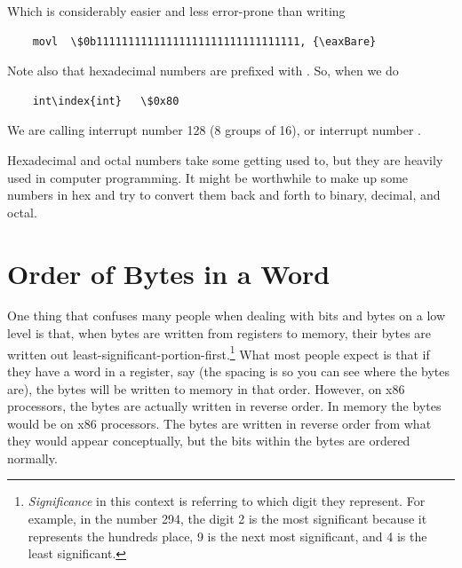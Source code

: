 Which is considerably easier and less error-prone than writing

\begin{simpletyping}
\begin{lstlisting}
	movl  \$0b11111111111111111111111111111111, {\eaxBare}
\end{lstlisting}
\end{simpletyping}

Note also that hexadecimal numbers are prefixed with .
So, when we do 

\begin{simpletyping}
\begin{lstlisting}
	int\index{int}   \$0x80
\end{lstlisting}
\end{simpletyping}

We are calling interrupt number 128 (8 groups of 16), or interrupt
number .

Hexadecimal and octal numbers take some getting used to, but they
are heavily used in computer programming.  It might be worthwhile
to make up some numbers in hex and try to convert them back and forth
to binary, decimal, and octal.

\section{Order of Bytes in a Word}

One thing that confuses many people when dealing with bits and bytes on a low
level is that, when bytes are written from registers to memory, their bytes
are written out least-significant-portion-first.\footnote{\emph{Significance} in this context is referring to which digit they represent.  For example, in the number 294, the digit 2 is the most significant because it represents the hundreds place, 9 is the next most significant, and 4 is the least significant.}  What most people expect
is that if they have a word in a register, say  (the spacing is so you can see where the bytes are), the bytes will be 
written to memory in that order.  However, on x86 processors, the bytes are actually
written in reverse order.  In memory the bytes would be 
 on x86 processors.  The bytes are written 
in reverse order from what they would appear conceptually, but the bits within 
the bytes are ordered normally.  

